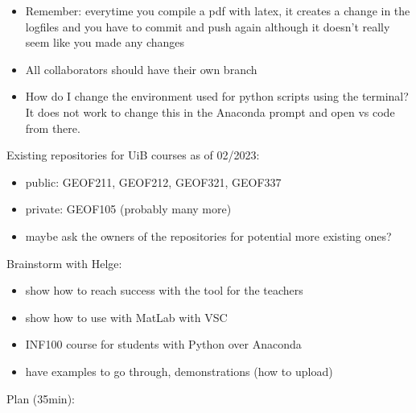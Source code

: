 \documentclass{article}
\begin{document}
    \begin{itemize}
        \item Remember: everytime you compile a pdf with latex, it creates a 
        change in the logfiles and you have to commit and push again although 
        it doesn't really seem like you made any changes
        \item All collaborators should have their own branch
        \item How do I change the environment used for python scripts using 
        the terminal? It does not work to change this in the Anaconda prompt 
        and open vs code from there. 
    \end{itemize}

Existing repositories for UiB courses as of 02/2023:
\begin{itemize}
    \item public: GEOF211, GEOF212, GEOF321, GEOF337
    \item private: GEOF105 (probably many more)
    \item maybe ask the owners of the repositories for potential more existing ones?
\end{itemize}

Brainstorm with Helge:
\begin{itemize}
    \item show how to reach success with the tool for the teachers
    \item show how to use with MatLab with VSC
    \item INF100 course for students with Python over Anaconda
    \item have examples to go through, demonstrations (how to upload)
\end{itemize}

\pagebreak

Plan (35min):
\end{document}
